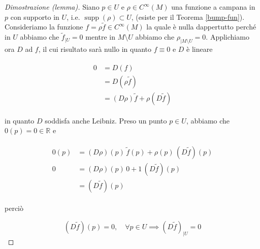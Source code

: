 \begin{proof}[Dimostrazione (lemma)]
	Siano $ p \in U $ e $ \rho \in C^{\infty}(M) $ una funzione a campana in $ p $ con supporto in $ U $, i.e. $ \operatorname{supp}(\rho) \subset U $, (esiste per il Teorema \ref{bump-fun}). Consideriamo la funzione $ f = \rho \tilde{f} \in C^{\infty}(M) $ la quale è nulla dappertutto perché in $ U $ abbiamo che $ \tilde{f}_{|U} = 0 $ mentre in $ M \setminus U $ abbiamo che $ \rho_{|M \setminus U} = 0 $. Applichiamo ora $ D $ ad $ f $, il cui risultato sarà nullo in quanto $ f \equiv 0 $ e $ D $ è lineare
	
	\begin{align}
		\begin{split}
			0 &= D(f)\\
			&= D (\rho \tilde{f})\\
			&= (D \rho) \tilde{f} + \rho (D \tilde{f})
		\end{split}
	\end{align}

	in quanto $ D $ soddisfa anche Leibniz. Preso un punto $ p \in U $, abbiamo che $ 0(p) = 0 \in \mathbb{R} $ e
	
	\begin{align}
		\begin{split}
			0(p) &= (D \rho)(p) \, \tilde{f}(p) + \rho(p) \, (D \tilde{f})(p)\\
			0 &= (D \rho)(p) \, 0 + 1 \, (D \tilde{f})(p)\\
			&= (D \tilde{f})(p)
		\end{split}
	\end{align}

	perciò
	
	\begin{equation}
		(D \tilde{f})(p) = 0, \quad \forall p \in U \implies (D \tilde{f})_{|U} = 0
	\end{equation}
\end{proof}

